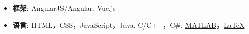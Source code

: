   \begin{itemize}[leftmargin=*]
    \item \textbf{框架}: AngularJS/Angular, Vue.js
    \item \textbf{语言}: HTML，CSS，JavaScript，Java, C/C++，C\#, \href{http://cn.mathworks.com/products/matlab/}{MATLAB}，\href{http://www.latex-project.org/}{\LaTeX}
  \end{itemize}